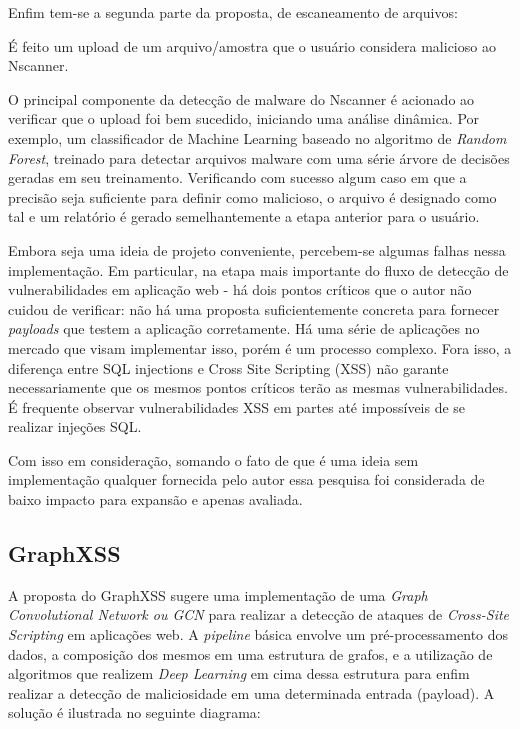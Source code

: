 Enfim tem-se a segunda parte da proposta, de escaneamento de arquivos:
\begin{alineas}
\item É feito um upload de um arquivo/amostra que o usuário considera malicioso ao Nscanner.
\item O principal componente da detecção de malware do Nscanner é acionado ao verificar que o upload foi bem sucedido, iniciando uma análise dinâmica. Por exemplo, um classificador de Machine Learning baseado no algoritmo de \textit{Random Forest}, treinado para detectar arquivos malware com uma série árvore de decisões geradas em seu treinamento. Verificando com sucesso algum caso em que a precisão seja suficiente para definir como malicioso, o arquivo é designado como tal e um relatório é gerado semelhantemente a etapa anterior para o usuário.
\end{alineas}

Embora seja uma ideia de projeto conveniente, percebem-se algumas falhas nessa implementação. Em particular, na etapa mais importante do fluxo de detecção de vulnerabilidades em aplicação web - há dois pontos críticos que o autor não cuidou de verificar: não há uma proposta suficientemente concreta para fornecer \textit{payloads} que testem a aplicação corretamente. Há uma série de aplicações no mercado que visam implementar isso, porém é um processo complexo. Fora isso, a diferença entre SQL injections e Cross Site Scripting (XSS) não garante necessariamente que os mesmos pontos críticos terão as mesmas vulnerabilidades. É frequente observar vulnerabilidades XSS em partes até impossíveis de se realizar injeções SQL.

Com isso em consideração, somando o fato de que é uma ideia sem implementação qualquer fornecida pelo autor essa pesquisa foi considerada de baixo impacto para expansão e apenas avaliada.

\subsection{GraphXSS}
A proposta do GraphXSS \cite{liu_graphxss_2022} sugere uma implementação de uma \textit{Graph Convolutional Network ou GCN} para realizar a detecção de ataques de \textit{Cross-Site Scripting} em aplicações web. A \textit{pipeline} básica envolve um pré-processamento dos dados, a composição dos mesmos em uma estrutura de grafos, e a utilização de algoritmos que realizem \textit{Deep Learning} em cima dessa estrutura para enfim realizar a detecção de maliciosidade em uma determinada entrada (payload). A solução é ilustrada no seguinte diagrama: 

